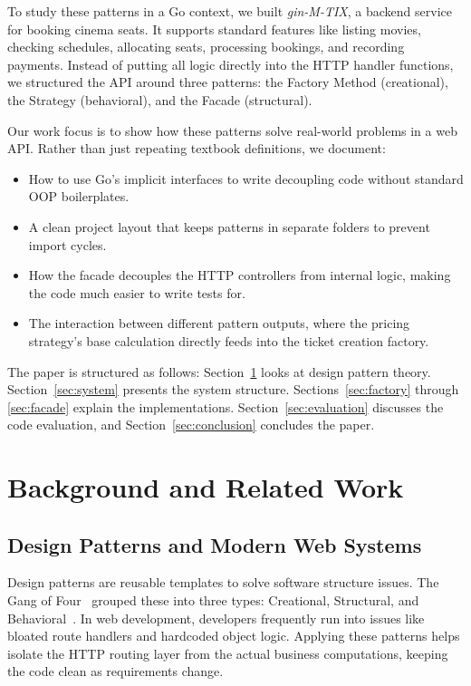 \documentclass[conference]{IEEEtran}
\begin{document}
To study these patterns in a Go context, we built \textit{gin-M-TIX}, a backend service for booking cinema seats. It supports standard features like listing movies, checking schedules, allocating seats, processing bookings, and recording payments. Instead of putting all logic directly into the HTTP handler functions, we structured the API around three patterns: the Factory Method (creational), the Strategy (behavioral), and the Facade (structural).

Our work focus is to show how these patterns solve real-world problems in a web API. Rather than just repeating textbook definitions, we document:
\begin{itemize}
  \item How to use Go's implicit interfaces to write decoupling code without standard OOP boilerplates.
  \item A clean project layout that keeps patterns in separate folders to prevent import cycles.
  \item How the facade decouples the HTTP controllers from internal logic, making the code much easier to write tests for.
  \item The interaction between different pattern outputs, where the pricing strategy's base calculation directly feeds into the ticket creation factory.
\end{itemize}

The paper is structured as follows: Section~\ref{sec:background} looks at design pattern theory. Section~\ref{sec:system} presents the system structure. Sections~\ref{sec:factory} through \ref{sec:facade} explain the implementations. Section~\ref{sec:evaluation} discusses the code evaluation, and Section~\ref{sec:conclusion} concludes the paper.

\section{Background and Related Work}
\label{sec:background}

\subsection{Design Patterns and Modern Web Systems}

Design patterns are reusable templates to solve software structure issues. The Gang of Four~\cite{gamma1994design} grouped these into three types: Creational, Structural, and Behavioral~\cite{flageol2023mapping}. In web development, developers frequently run into issues like bloated route handlers and hardcoded object logic. Applying these patterns helps isolate the HTTP routing layer from the actual business computations, keeping the code clean as requirements change.
\end{document}
